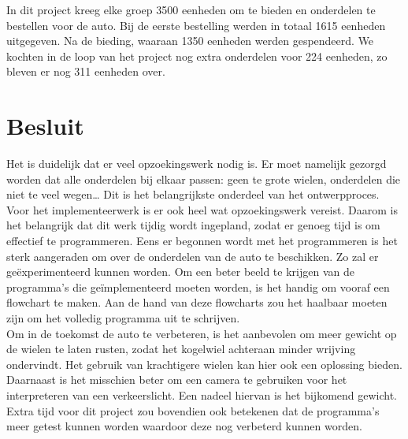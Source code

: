 \documentclass[a4paper,twoside,kulak]{kulakreport} %
\begin{document}
In dit project kreeg elke groep 3500 eenheden om te bieden en onderdelen te bestellen voor de auto. Bij de eerste bestelling werden in totaal 1615 eenheden uitgegeven. Na de bieding, waaraan 1350 eenheden werden gespendeerd. We kochten in de loop van het project nog extra onderdelen voor 224 eenheden, zo bleven er nog 311 eenheden over.
\\


\section{Besluit}
Het is duidelijk dat er veel opzoekingswerk nodig is. Er moet namelijk gezorgd worden dat alle onderdelen bij elkaar passen: geen te grote wielen, onderdelen die niet te veel wegen… Dit is het belangrijkste onderdeel van het ontwerpproces.\\
Voor het implementeerwerk is er ook heel wat opzoekingswerk vereist. Daarom is het belangrijk dat dit werk tijdig wordt ingepland, zodat er genoeg tijd is om effectief te programmeren. Eens er begonnen wordt met het programmeren is het sterk aangeraden om over de onderdelen van de auto te beschikken. Zo zal er geëxperimenteerd kunnen worden. Om een beter beeld te krijgen van de programma’s die geïmplementeerd moeten worden, is het handig om vooraf een flowchart te maken. Aan de hand van deze flowcharts zou het haalbaar moeten zijn om het volledig programma uit te schrijven.\\
Om in de toekomst de auto te verbeteren, is het aanbevolen om meer gewicht op de wielen te laten rusten, zodat het kogelwiel achteraan minder wrijving ondervindt. Het gebruik van krachtigere wielen kan hier ook een oplossing bieden. Daarnaast is het misschien beter om een camera te gebruiken voor het interpreteren van een verkeerslicht. Een nadeel hiervan is het bijkomend gewicht. 
Extra tijd voor dit project zou bovendien ook betekenen dat de programma’s meer getest kunnen worden waardoor deze nog verbeterd kunnen worden.



\newpage

\appendix
\label{financieel rapport}
\label{TechTekChassis}
\label{TechTekWiel}
\label{TechTekMotor}
\label{TechTekMicrocontroller}
\label{TechTekReflectiesensor}
\label{TechTekAfstandssensor}
\label{TechTekKleurensensor}







\end{document}
